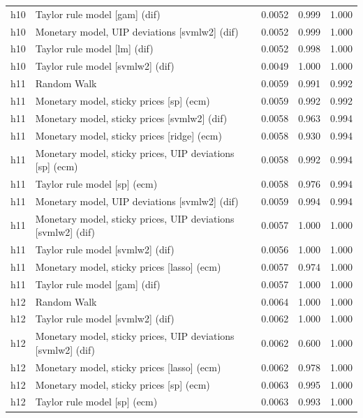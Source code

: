\begin{ThreePartTable}
\begin{longtable}[t]{cp{5.5cm}ccc}
h10 & \raggedright Taylor rule model [gam] (dif) & 0.0052 & 0.999 & 1.000\\
h10 & \raggedright Monetary model, UIP deviations [svmlw2] (dif) & 0.0052 & 0.999 & 1.000\\
h10 & \raggedright Taylor rule model [lm] (dif) & 0.0052 & 0.998 & 1.000\\
h10 & \raggedright Taylor rule model [svmlw2] (dif) & 0.0049 & 1.000 & 1.000\\
\addlinespace
h11 & \raggedright Random Walk & 0.0059 & 0.991 & 0.992\\
h11 & \raggedright Monetary model, sticky prices [sp] (ecm) & 0.0059 & 0.992 & 0.992\\
h11 & \raggedright Monetary model, sticky prices [svmlw2] (dif) & 0.0058 & 0.963 & 0.994\\
h11 & \raggedright Monetary model, sticky prices [ridge] (ecm) & 0.0058 & 0.930 & 0.994\\
h11 & \raggedright Monetary model, sticky prices, UIP deviations [sp] (ecm) & 0.0058 & 0.992 & 0.994\\
h11 & \raggedright Taylor rule model [sp] (ecm) & 0.0058 & 0.976 & 0.994\\
h11 & \raggedright Monetary model, UIP deviations [svmlw2] (dif) & 0.0059 & 0.994 & 0.994\\
h11 & \raggedright Monetary model, sticky prices, UIP deviations [svmlw2] (dif) & 0.0057 & 1.000 & 1.000\\
h11 & \raggedright Taylor rule model [svmlw2] (dif) & 0.0056 & 1.000 & 1.000\\
h11 & \raggedright Monetary model, sticky prices [lasso] (ecm) & 0.0057 & 0.974 & 1.000\\
h11 & \raggedright Taylor rule model [gam] (dif) & 0.0057 & 1.000 & 1.000\\
\addlinespace
h12 & \raggedright Random Walk & 0.0064 & 1.000 & 1.000\\
h12 & \raggedright Taylor rule model [svmlw2] (dif) & 0.0062 & 1.000 & 1.000\\
h12 & \raggedright Monetary model, sticky prices, UIP deviations [svmlw2] (dif) & 0.0062 & 0.600 & 1.000\\
h12 & \raggedright Monetary model, sticky prices [lasso] (ecm) & 0.0062 & 0.978 & 1.000\\
h12 & \raggedright Monetary model, sticky prices [sp] (ecm) & 0.0063 & 0.995 & 1.000\\
h12 & \raggedright Taylor rule model [sp] (ecm) & 0.0063 & 0.993 & 1.000\\

\end{longtable}
\end{ThreePartTable}
